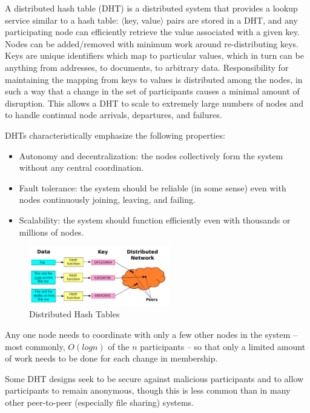 \documentclass[a4paper,12pt]{article}
\begin{document}
A distributed hash table (DHT) is a distributed system that provides a lookup service similar to a hash table: $\langle$key, value$\rangle$ pairs are stored in a DHT, and any participating node can efficiently retrieve the value associated with a given key. Nodes can be added/removed with minimum work around re-distributing keys. Keys are unique identifiers which map to particular values, which in turn can be anything from addresses, to documents, to arbitrary data. Responsibility for maintaining the mapping from keys to values is distributed among the nodes, in such a way that a change in the set of participants causes a minimal amount of disruption. This allows a DHT to scale to extremely large numbers of nodes and to handle continual node arrivals, departures, and failures.

DHTs characteristically emphasize the following properties:
\begin{itemize}
\itemsep0em

\item Autonomy and decentralization: the nodes collectively form the system without any central coordination.

\item Fault tolerance: the system should be reliable (in some sense) even with nodes continuously joining, leaving, and failing.

\item Scalability: the system should function efficiently even with thousands or millions of nodes.

\end{itemize}

\begin{figure}
\centering
\includegraphics[width=0.55\textwidth]{./img/dht.png}
\caption{\label{fig:dht}Distributed Hash Tables}
\end{figure}

Any one node needs to coordinate with only a few other nodes in the system -- most commonly, $O(log n)$ of the $n$ participants -- so that only a limited amount of work needs to be done for each change in membership.

Some DHT designs seek to be secure against malicious participants and to allow participants to remain anonymous, though this is less common than in many other peer-to-peer (especially file sharing) systems.
\end{document}
